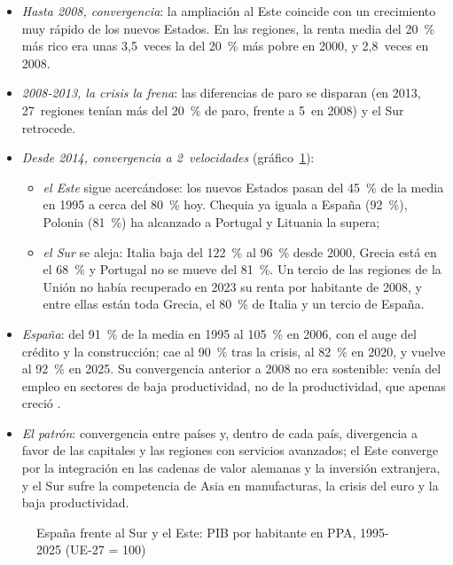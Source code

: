 \documentclass[11pt]{article}
\begin{document}
\begin{itemize}
\item \emph{Hasta 2008, convergencia}: la ampliación al Este coincide con un crecimiento muy rápido de los nuevos Estados. En las regiones, la renta media del 20~\% más rico era unas 3,5~veces la del 20~\% más pobre en 2000, y 2,8~veces en 2008\nocite{CE2022Informe8}.
\item \emph{2008-2013, la crisis la frena}: las diferencias de paro se disparan (en 2013, 27~regiones tenían más del 20~\% de paro, frente a 5~en 2008) y el Sur retrocede\nocite{CE2022Informe8}.
\item \emph{Desde 2014, convergencia a 2~velocidades} (gráfico~\ref{fig:pib-pc-paises})\nocite{Eurostat2026PPA}:
  \begin{itemize}
  \item \emph{el Este} sigue acercándose: los nuevos Estados pasan del 45~\% de la media en 1995 a cerca del 80~\% hoy\nocite{CE2024Informe9}. Chequia ya iguala a España (92~\%), Polonia (81~\%) ha alcanzado a Portugal y Lituania la supera;
  \item \emph{el Sur} se aleja: Italia baja del 122~\% al 96~\% desde 2000, Grecia está en el 68~\% y Portugal no se mueve del 81~\%. Un tercio de las regiones de la Unión no había recuperado en 2023 su renta por habitante de 2008, y entre ellas están toda Grecia, el 80~\% de Italia y un tercio de España\nocite{CE2024Informe9}.
  \end{itemize}
\item \emph{España}: del 91~\% de la media en 1995 al 105~\% en 2006, con el auge del crédito y la construcción; cae al 90~\% tras la crisis, al 82~\% en 2020, y vuelve al 92~\% en 2025. Su convergencia anterior a 2008 no era sostenible: venía del empleo en sectores de baja productividad, no de la productividad, que apenas creció  .
\item \emph{El patrón}: convergencia entre países y, dentro de cada país, divergencia a favor de las capitales y las regiones con servicios avanzados; el Este converge por la integración en las cadenas de valor alemanas y la inversión extranjera, y el Sur sufre la competencia de Asia en manufacturas, la crisis del euro y la baja productividad\nocite{IammarinoEtAl2019}.
\end{itemize}

\begin{figure}[H]
\centering
\caption{España frente al Sur y el Este: PIB por habitante en PPA, 1995-2025 (UE-27 = 100)}\label{fig:pib-pc-paises}
\end{figure}
\end{document}
